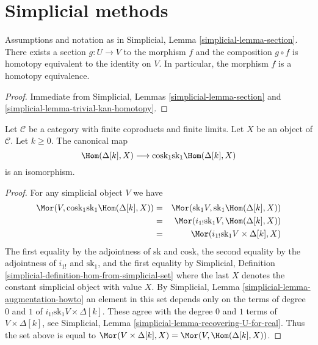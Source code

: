 \section{Simplicial methods}
\label{section-simplicial}


\begin{lemma}
\label{lemma-equiv}
Assumptions and notation as in
Simplicial, Lemma \ref{simplicial-lemma-section}.
There exists a section $g : U \to V$ to the morphism $f$ and
the composition $g \circ f$ is homotopy equivalent to the identity
on $V$. In particular, the morphism $f$ is a homotopy equivalence.
\end{lemma}

\begin{proof}
Immediate from Simplicial, Lemmas \ref{simplicial-lemma-section} and
\ref{simplicial-lemma-trivial-kan-homotopy}.
\end{proof}

\begin{lemma}
\label{lemma-cosk-hom-deltak}
Let $\mathcal{C}$ be a category with finite coproducts
and finite limits. Let $X$ be an object of $\mathcal{C}$.
Let $k \geq 0$. The canonical map
$$
\Hom(\Delta[k], X)
\longrightarrow
\text{cosk}_1 \text{sk}_1 \Hom(\Delta[k], X)
$$
is an isomorphism.
\end{lemma}

\begin{proof}
For any simplicial object $V$ we have
\begin{eqnarray*}
\Mor(V, \text{cosk}_1 \text{sk}_1 \Hom(\Delta[k], X))
& = &
\Mor(\text{sk}_1 V, \text{sk}_1 \Hom(\Delta[k], X)) \\
& = &
\Mor(i_{1!} \text{sk}_1 V, \Hom(\Delta[k], X)) \\
& = &
\Mor(i_{1!} \text{sk}_1 V \times \Delta[k], X)
\end{eqnarray*}
The first equality by the adjointness of $\text{sk}$ and $\text{cosk}$,
the second equality by the adjointness of $i_{1!}$ and $\text{sk}_1$, and
the first equality by
Simplicial, Definition \ref{simplicial-definition-hom-from-simplicial-set}
where the last $X$ denotes the constant simplicial object with value $X$.
By Simplicial, Lemma \ref{simplicial-lemma-augmentation-howto} an element
in this set depends only on the terms of degree $0$ and $1$
of $i_{1!} \text{sk}_1 V \times \Delta[k]$. These
agree with the degree $0$ and $1$ terms of
$V \times \Delta[k]$, see
Simplicial, Lemma \ref{simplicial-lemma-recovering-U-for-real}.
Thus the set above is equal to
$\Mor(V \times \Delta[k], X) = \Mor(V, \Hom(\Delta[k], X))$.
\end{proof}

